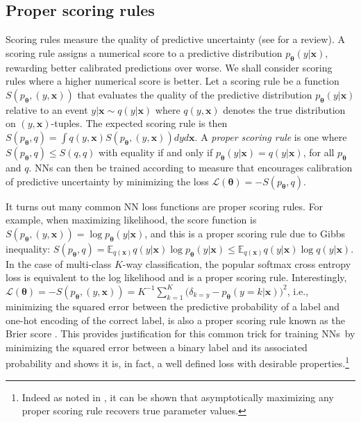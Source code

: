 \documentclass{article}
\newcommand{\bx}{\mathbf{x}}
\newcommand{\btheta}{\mathbf{\theta}}
\newcommand{\loss}{\mathcal{L}}
\newcommand{\nn}{NNs}
\begin{document}
\subsection{Proper scoring rules}

Scoring rules measure the quality of predictive uncertainty (see \citep{gneiting2007strictly} for a review).
A scoring rule assigns a numerical score to a predictive distribution $p_\btheta(y|\bx)$, rewarding better calibrated predictions over worse.
We shall consider scoring rules where a higher numerical score is better.
Let a scoring rule be a function $S(p_\btheta, (y, \bx))$ that evaluates the quality of the predictive distribution $p_\btheta(y|\bx)$ relative to an event $y| \bx \sim q(y|\bx)$
 where $q(y,\bx)$ denotes the true distribution on $(y,\bx)$-tuples.
The expected scoring rule is then $S(p_\btheta,q) = \int q(y, \bx) S(p_\btheta,(y, \bx)) dy d\bx$. 
A \emph{proper scoring rule} is one where $S(p_\btheta,q) \le S(q,q)$
with equality if and only if $p_\btheta(y|\bx) = q(y|\bx)$, for all $p_\btheta$ and $q$.
NNs can then be trained according to measure that encourages calibration of predictive uncertainty by minimizing the loss $\loss(\btheta) = -S(p_\btheta, q)$.

It turns out many common NN loss functions are proper scoring rules.
For example, when maximizing likelihood, the score function is $S(p_\btheta, (y,\bx)) = \log p_\btheta(y|\bx)$,
and this is a proper scoring rule due to Gibbs inequality: $S(p_\btheta, q) = \mathbb{E}_{q(\bx)}  q(y|\bx) \log p_\btheta(y|\bx) \leq \mathbb{E}_{q(\bx)}  q(y|\bx) \log q(y|\bx)$. 
In the case of multi-class $K$-way classification, the popular softmax cross entropy loss is equivalent to the log likelihood and is a proper scoring rule. 
Interestingly, $\loss(\btheta) = -S(p_\btheta, (y,\bx)) = K^{-1} \sum_{k=1}^K \bigl(\delta_{k=y} - p_\btheta(y=k|\bx)\bigr)^2$, i.e., minimizing the squared error between the
predictive probability of a label and one-hot encoding of the correct label, is also a proper scoring rule known as the Brier score \citep{brier1950verification}.
This provides justification for this common trick for training \nn~by minimizing the squared error between a binary label and its associated probability and shows it is, in fact, a well defined loss
with desirable properties.\footnote{Indeed as noted in \citet{gneiting2007strictly}, it can be shown that asymptotically maximizing any proper scoring rule recovers true parameter values.}
\end{document}
